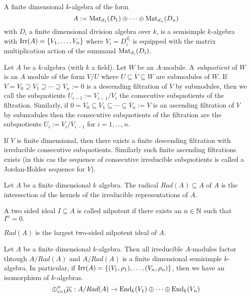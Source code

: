 \begin{thm}
A finite dimensional \(k\)-algebra of the form
\[
A:=\operatorname{Mat}_{d_{1}}(D_{1})\oplus \cdots \oplus \operatorname{Mat}_{d_{n}}(D_{n})
\]
with \(D_{i}\) a finite dimensional division algebra over \(k\), is a semisimple \(k\)-algebra with \(\operatorname{Irr}(A)=\{V_{1},\ldots ,V_{n}\}\) where \(V_{i}=D_{i}^{d_{i}}\) is equipped with the matrix multiplication action of the summand \(\operatorname{Mat}_{d_{i}}(D_{i})\).
\end{thm}

\begin{defn}
Let \(A\) be a \(k\)-algebra (with \(k\) a field). Let \(W\) be an \(A\)-module. A \emph{subquotient} of \(W\) is an \(A\) module of the form \(V/U\) where \(U\subseteq V\subseteq W\) are submodules of \(W\). If \(V=V_{0}\supseteq V_{1}\supseteq \cdots \supseteq V_{n}:=0\) is a descending filtration of \(V\) by submodules, then we call the subquotients \(U_{i-1}:=V_{i-1}/V_{i}\) the consecutive subquotients of the filtration. Similarly, if \(0=V_{0}\subseteq V_{1}\subseteq \cdots \subseteq V_{n}:=V\) is an ascending filtration of \(V\) by submodules then the consecutive subquotients of the filtration are the subquotients \(U_{i}:=V_{i}/V_{i-1}\) for \(i=1,\ldots ,n\).
\end{defn}

\begin{prop}
If \(V\) is finite dimensional, then there exists a finite descending filtration with irreducible consecutive subquotients. Similarly such finite ascending filtrations exists (in this cas the sequence of consecutive irreducible subquotients is called a Jordan-Holder sequence for \(V\)).
\end{prop}

\begin{defn}
Let \(A\) be a finite dimensional \(k\) algebra. The radical \(Rad(A)\subseteq A\) of \(A\) is the intersection of the kernels of the irreducible representations of \(A\).
\end{defn}

\begin{defn}
A two sided ideal \(I\subseteq A\) is called nilpotent if there exists an \(n\in \Bbb{N}\) such that \(I^n=0.\)
\end{defn}

\begin{prop}
\(Rad(A)\) is the largest two-sided nilpotent ideal of \(A\).
\end{prop}

\begin{thm}
Let \(A\) be a finite dimensional \(k\)-algebra. Then all irreducible \(A\)-modules factor thtough \(A/Rad(A)\) and \(A/Rad(A)\) is a finite dimensional semisimple \(k\)-algebra. In particular, if \(\operatorname{Irr}(A)=\{(V_{1},\rho _{1}),\ldots ,(V_{n},\rho _{n})\}\), then we have an isomorphism of \(k\)-algebras.
\[
\oplus _{i=1}^n \overline{\rho _{i}}:A/Rad(A) \rightarrow  \operatorname{End}_{k}(V_{1})\oplus \cdots \oplus \operatorname{End}_{k}(V_{n})
\]
\end{thm}




